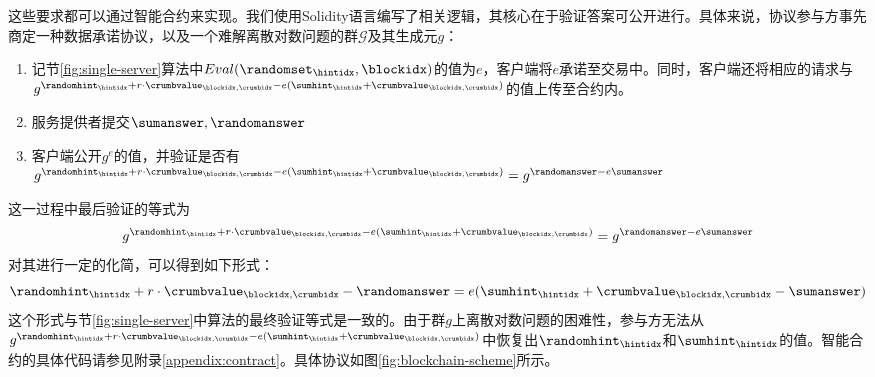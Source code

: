 这些要求都可以通过智能合约来实现。我们使用Solidity语言编写了相关逻辑，其核心在于验证答案可公开进行。具体来说，协议参与方事先商定一种数据承诺协议，以及一个难解离散对数问题的群$\mathcal{G}$及其生成元$g$：
\begin{enumerate}
    \item 记节\ref{fig:single-server}算法中$Eval(\randomset_\hintidx, \blockidx)$的值为$e$，客户端将$e$承诺至交易中。同时，客户端还将相应的请求与$g^{\randomhint_\hintidx+r\cdot \crumbvalue_{\blockidx, \crumbidx}-e(\sumhint_\hintidx+\crumbvalue_{\blockidx, \crumbidx})}$的值上传至合约内。
    \item 服务提供者提交$\sumanswer,\randomanswer$
    \item 客户端公开$g^e$的值，并验证是否有$g^{\randomhint_\hintidx+r\cdot \crumbvalue_{\blockidx, \crumbidx}-e(\sumhint_\hintidx+\crumbvalue_{\blockidx, \crumbidx})}=g^{\randomanswer-e\sumanswer}$
\end{enumerate}

这一过程中最后验证的等式为
$$g^{\randomhint_\hintidx+r\cdot \crumbvalue_{\blockidx, \crumbidx}-e(\sumhint_\hintidx+\crumbvalue_{\blockidx, \crumbidx})}=g^{\randomanswer-e\sumanswer}$$
对其进行一定的化简，可以得到如下形式：
$$\randomhint_\hintidx+r\cdot \crumbvalue_{\blockidx, \crumbidx}-\randomanswer=e(\sumhint_\hintidx+\crumbvalue_{\blockidx, \crumbidx}-\sumanswer)$$
这个形式与节\ref{fig:single-server}中算法的最终验证等式是一致的。由于群$g$上离散对数问题的困难性，参与方无法从$g^{\randomhint_\hintidx+r\cdot \crumbvalue_{\blockidx, \crumbidx}-e(\sumhint_\hintidx+\crumbvalue_{\blockidx, \crumbidx})}$中恢复出$\randomhint_\hintidx$和$\sumhint_\hintidx$的值。智能合约的具体代码请参见附录\ref{appendix:contract}。具体协议如图\ref{fig:blockchain-scheme}所示。


